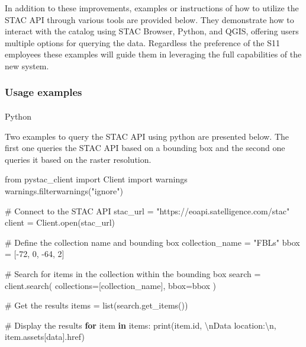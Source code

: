 \documentclass[
  oneside,
  open=any]{scrbook}
\makeatletter
\let\oldparagraph\paragraph
\renewcommand{\paragraph}{
    \@ifstar
      \xxxParagraphStar
      \xxxParagraphNoStar
  }
\newcommand{\xxxParagraphStar}[1]{\oldparagraph*{#1}\mbox{}}
\newcommand{\xxxParagraphNoStar}[1]{\oldparagraph{#1}\mbox{}}
\newenvironment{Shaded}{\begin{snugshade}}{\end{snugshade}}
\newcommand{\BuiltInTok}[1]{\textcolor[rgb]{0.00,0.23,0.31}{#1}}
\newcommand{\CharTok}[1]{\textcolor[rgb]{0.13,0.47,0.30}{#1}}
\newcommand{\CommentTok}[1]{\textcolor[rgb]{0.37,0.37,0.37}{#1}}
\newcommand{\ControlFlowTok}[1]{\textcolor[rgb]{0.00,0.23,0.31}{\textbf{#1}}}
\newcommand{\DecValTok}[1]{\textcolor[rgb]{0.68,0.00,0.00}{#1}}
\newcommand{\ImportTok}[1]{\textcolor[rgb]{0.00,0.46,0.62}{#1}}
\newcommand{\KeywordTok}[1]{\textcolor[rgb]{0.00,0.23,0.31}{\textbf{#1}}}
\newcommand{\NormalTok}[1]{\textcolor[rgb]{0.00,0.23,0.31}{#1}}
\newcommand{\OperatorTok}[1]{\textcolor[rgb]{0.37,0.37,0.37}{#1}}
\newcommand{\StringTok}[1]{\textcolor[rgb]{0.13,0.47,0.30}{#1}}
\makeatother
\begin{document}
In addition to these improvements, examples or instructions of how to
utilize the STAC API through various tools are provided below. They
demonstrate how to interact with the catalog using STAC Browser, Python,
and QGIS, offering users multiple options for querying the data.
Regardless the preference of the S11 employees these examples will guide
them in leveraging the full capabilities of the new system.

\subsubsection{Usage examples}\label{usage-examples}

\paragraph{Python}\label{python}

Two examples to query the STAC API using python are presented below. The
first one queries the STAC API based on a bounding box and the second
one queries it based on the raster resolution.

\begin{Shaded}
\begin{Highlighting}[]
\ImportTok{from}\NormalTok{ pystac\_client }\ImportTok{import}\NormalTok{ Client}
\ImportTok{import}\NormalTok{ warnings}
\NormalTok{warnings.filterwarnings(}\StringTok{"ignore"}\NormalTok{)}

\CommentTok{\# Connect to the STAC API}
\NormalTok{stac\_url }\OperatorTok{=} \StringTok{"https://eoapi.satelligence.com/stac"}
\NormalTok{client }\OperatorTok{=}\NormalTok{ Client.}\BuiltInTok{open}\NormalTok{(stac\_url)}

\CommentTok{\# Define the collection name and bounding box}
\NormalTok{collection\_name }\OperatorTok{=} \StringTok{"FBLs"}
\NormalTok{bbox }\OperatorTok{=}\NormalTok{ [}\OperatorTok{{-}}\DecValTok{72}\NormalTok{, }\DecValTok{0}\NormalTok{, }\OperatorTok{{-}}\DecValTok{64}\NormalTok{, }\DecValTok{2}\NormalTok{] }

\CommentTok{\# Search for items in the collection within the bounding box}
\NormalTok{search }\OperatorTok{=}\NormalTok{ client.search(}
\NormalTok{    collections}\OperatorTok{=}\NormalTok{[collection\_name],}
\NormalTok{    bbox}\OperatorTok{=}\NormalTok{bbox}
\NormalTok{)}

\CommentTok{\# Get the results}
\NormalTok{items }\OperatorTok{=} \BuiltInTok{list}\NormalTok{(search.get\_items())}

\CommentTok{\# Display the results}
\ControlFlowTok{for}\NormalTok{ item }\KeywordTok{in}\NormalTok{ items:}
    \BuiltInTok{print}\NormalTok{(item.}\BuiltInTok{id}\NormalTok{, }\StringTok{\textquotesingle{}}\CharTok{\textbackslash{}n}\StringTok{Data location:}\CharTok{\textbackslash{}n}\StringTok{\textquotesingle{}}\NormalTok{, item.assets[}\StringTok{\textquotesingle{}data\textquotesingle{}}\NormalTok{].href)}
\end{Highlighting}
\end{Shaded}
\end{document}
